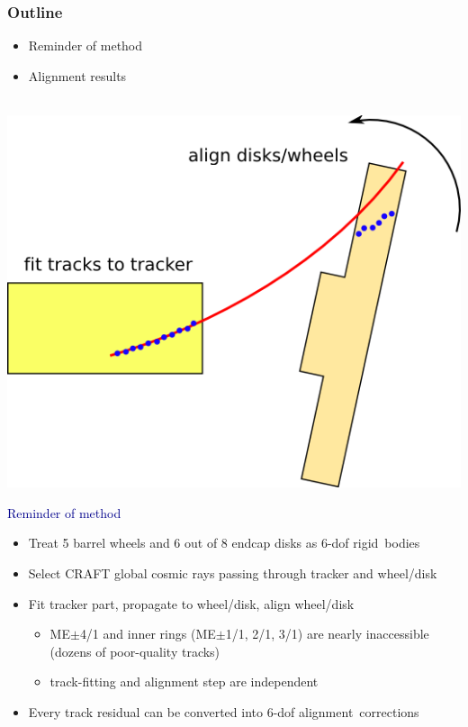 \documentclass[compress]{beamer}
\begin{document}
\begin{frame}
\frametitle{Outline}
\begin{itemize}
\item Reminder of method
\item Alignment results
\end{itemize}

\vspace{-1.5 cm}
\mbox{ } \hfill \includegraphics[width=0.4\linewidth]{globalMuon_alignment.png}

\vspace{-0.75 cm}
\hspace{-0.83 cm} \textcolor{darkblue}{\Large Reminder of method}

\vspace{0.25 cm}
\begin{itemize}
\item Treat 5 barrel wheels and 6 out of 8 endcap disks as 6-dof \mbox{rigid bodies\hspace{-1 cm}}
\item Select CRAFT global cosmic rays passing through tracker and wheel/disk
\item Fit tracker part, propagate to wheel/disk, align wheel/disk
\begin{itemize}
\item ME$\pm$4/1 and inner rings (ME$\pm$1/1, 2/1, 3/1) are nearly
  inaccessible (dozens of poor-quality tracks)
\item track-fitting and alignment step are independent
\end{itemize}
\item Every track residual can be converted into 6-dof \mbox{alignment corrections\hspace{-1 cm}}
\end{itemize}

\end{frame}

\end{document}
